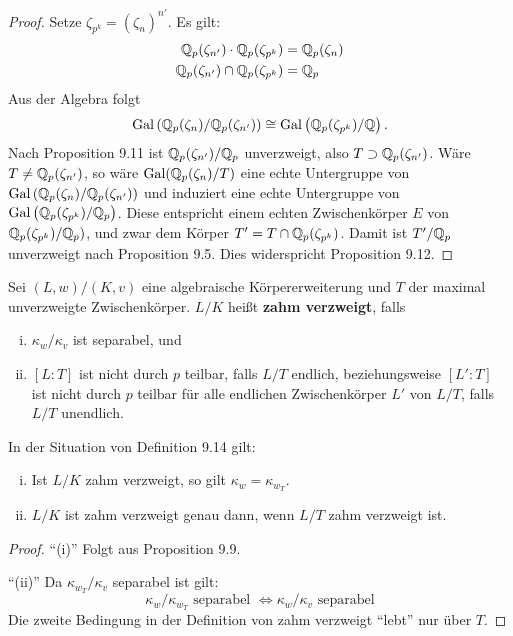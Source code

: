 \begin{proof}
	Setze $\zeta_{p^k} = (\zeta_n)^{n'}$. Es gilt:
	\begin{align*}
	\mathbb{Q}_p(\zeta_{n'}) \cdot \mathbb{Q}_p(\zeta_{p^k}) &= \mathbb{Q}_p(\zeta_n) \\
	\mathbb{Q}_p(\zeta_{n'}) \cap \mathbb{Q}_p(\zeta_{p^k}) &= \mathbb{Q}_p
	\end{align*}
	Aus der Algebra folgt
	\begin{align*}
	\operatorname{Gal}\left( \mathbb{Q}_p(\zeta_n) / \mathbb{Q}_p(\zeta_{n'}) \right)
	\cong \operatorname{Gal}\left( \mathbb{Q}_p(\zeta_{p^k}) / \mathbb{Q} \right).
	\end{align*}
	Nach Proposition 9.11 ist $\mathbb{Q}_p(\zeta_{n'}) / \mathbb{Q}_p$ unverzweigt, also $T\supset \mathbb{Q}_p(\zeta_{n'})$.
	Wäre $T \neq \mathbb{Q}_p(\zeta_{n'})$, so wäre $\operatorname{Gal}(\mathbb{Q}_p(\zeta_n)/T)$ eine echte Untergruppe von $\operatorname{Gal}\left( \mathbb{Q}_p(\zeta_n) / \mathbb{Q}_p(\zeta_{n'})  \right)$ und induziert eine echte Untergruppe von $\operatorname{Gal}\left( \mathbb{Q}_p(\zeta_{p^k}) / \mathbb{Q}_p \right)$. Diese entspricht einem echten Zwischenkörper $E$ von $\mathbb{Q}_p(\zeta_{p^k}) / \mathbb{Q}_p)$, und zwar dem Körper $T' = T \cap \mathbb{Q}_p(\zeta_{p^k})$. Damit ist $T'/\mathbb{Q}_p$ unverzweigt nach Proposition 9.5.
	Dies widerspricht Proposition 9.12.
\end{proof}

\begin{defi}
	Sei $(L,w)/(K,v)$ eine algebraische Körpererweiterung und $T$ der maximal unverzweigte Zwischenkörper. $L/K$ heißt \textbf{zahm verzweigt}, falls
	\begin{enumerate}[(i)]
		\item $\kappa_w/\kappa_v$ ist separabel, und
		\item $[L:T]$ ist nicht durch $p$ teilbar, falls $L/T$ endlich, beziehungsweise
		$[L':T]$ ist nicht durch $p$ teilbar für alle endlichen Zwischenkörper $L'$ von $L/T$,
		falls $L/T$ unendlich.
	\end{enumerate}
\end{defi}


\begin{Bem}
	In der Situation von Definition 9.14 gilt:
	\begin{enumerate}[(i)]
		\item Ist $L/K$ zahm verzweigt, so gilt $\kappa_w=\kappa_{w_T}$.
		\item $L/K$ ist zahm verzweigt genau dann, wenn $L/T$ zahm verzweigt ist.
	\end{enumerate}
\end{Bem}

\begin{proof}
	\enquote{(i)} Folgt aus Proposition 9.9.
	
	\bigskip \enquote{(ii)} Da $\kappa_{w_T} / \kappa_v$ separabel ist gilt:
	\[ \kappa_w / \kappa_{w_T} \text{ separabel } \Leftrightarrow \kappa_w / \kappa_v \text{ separabel}
	\]
	Die zweite Bedingung in der Definition von zahm verzweigt \enquote{lebt} nur über $T$.
\end{proof}

